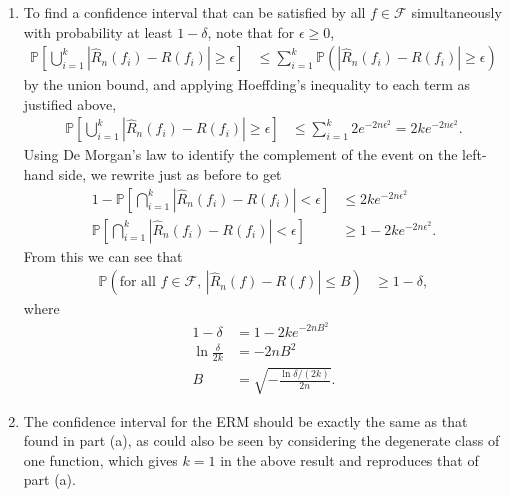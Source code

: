 \documentclass[11pt,letterpaper]{article}
\newcommand{\e}{\epsilon}
\numberwithin{equation}{section}
\numberwithin{figure}{section}
\begin{document}
\begin{enumerate}
\begin{enumerate}
		\item To find a confidence interval that can be satisfied by all $f \in \mathcal{F}$ simultaneously with probability at least $1-\delta$, note that for $\e \geq 0$,
		\begin{align*}
			\mathbb{P}\left[\bigcup_{i=1}^k |\hat{R}_n(f_i) - R(f_i)| \geq \e\right] &\leq \sum_{i=1}^k \mathbb{P}\left(|\hat{R}_n(f_i) - R(f_i)| \geq \e\right)
		\end{align*}
		by the union bound, and applying Hoeffding's inequality to each term as justified above,
		\begin{align*}
			\mathbb{P}\left[\bigcup_{i=1}^k |\hat{R}_n(f_i) - R(f_i)| \geq \e\right] &\leq \sum_{i=1}^k 2e^{-2n\e^2} = 2ke^{-2n\e^2}.
		\end{align*}
		Using De Morgan's law to identify the complement of the event on the left-hand side, we rewrite just as before to get
		\begin{align*}
			1 - \mathbb{P}\left[\bigcap_{i=1}^k |\hat{R}_n(f_i) - R(f_i)|<\e\right] &\leq 2k e^{-2n\e^2}\\
			\mathbb{P}\left[\bigcap_{i=1}^k |\hat{R}_n(f_i) - R(f_i)|<\e\right] &\geq 1 - 2k e^{-2n\e^2}.
		\end{align*}
		From this we can see that
		\begin{align*}
			\mathbb{P}\left(\text{for all $f\in\mathcal{F}$, } |\hat{R}_n(f) - R(f)| \leq B\right) &\geq 1-\delta,
		\end{align*}
		where
		\begin{align*}
			1 - \delta &= 1 - 2k e^{-2nB^2}\\
			\ln \frac{\delta}{2k} &= -2nB^2\\
			B &= \sqrt{-\frac{\ln \delta/(2k)}{2n}}.
		\end{align*}








		\item The confidence interval for the ERM should be exactly the same as that found in part (a), as could also be seen by considering the degenerate class of one function, which gives $k=1$ in the above result and reproduces that of part (a).








\end{enumerate}
\end{enumerate}
\end{document}
